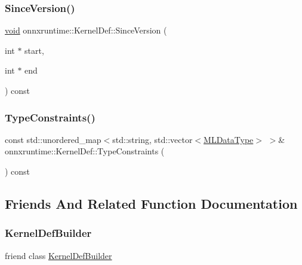 \subsubsection{\texorpdfstring{Since\+Version()}{SinceVersion()}}
{\footnotesize\ttfamily \mbox{\hyperlink{mlasi_8h_a88f941d423cb2a819b70a1358982b1a6}{void}} onnxruntime\+::\+Kernel\+Def\+::\+Since\+Version (\begin{DoxyParamCaption}\item[{int $\ast$}]{start,  }\item[{int $\ast$}]{end }\end{DoxyParamCaption}) const\hspace{0.3cm}{\ttfamily [inline]}}

\mbox{\label{classonnxruntime_1_1KernelDef_a6639ce1c43c3d37e84eb9db07921b1e8}} 
\subsubsection{\texorpdfstring{Type\+Constraints()}{TypeConstraints()}}
{\footnotesize\ttfamily const std\+::unordered\+\_\+map$<$std\+::string, std\+::vector$<$\mbox{\hyperlink{namespaceonnxruntime_ad77d0a6e838ec7da5dc35fed5ee66b49}{M\+L\+Data\+Type}}$>$ $>$\& onnxruntime\+::\+Kernel\+Def\+::\+Type\+Constraints (\begin{DoxyParamCaption}{ }\end{DoxyParamCaption}) const\hspace{0.3cm}{\ttfamily [inline]}}



\subsection{Friends And Related Function Documentation}
\mbox{\label{classonnxruntime_1_1KernelDef_a33a81fbddaa5f272008974dd2a2bf591}} 
\subsubsection{\texorpdfstring{Kernel\+Def\+Builder}{KernelDefBuilder}}
{\footnotesize\ttfamily friend class \mbox{\hyperlink{classonnxruntime_1_1KernelDefBuilder}{Kernel\+Def\+Builder}}\hspace{0.3cm}{\ttfamily [friend]}}



